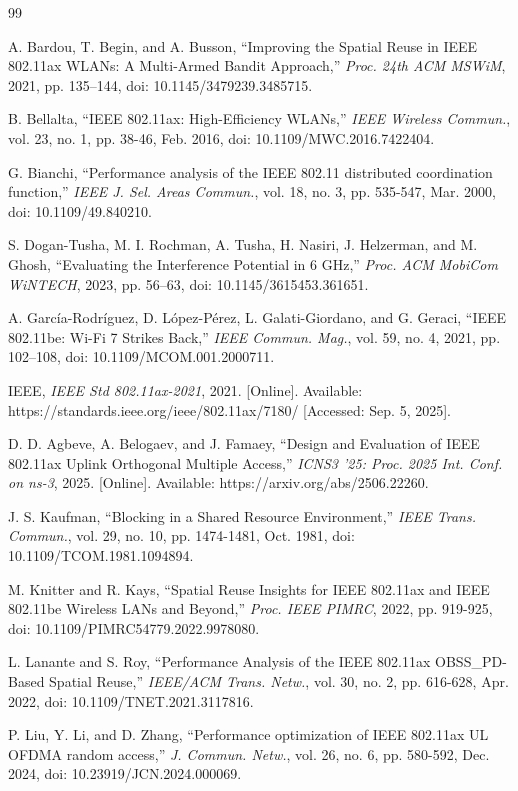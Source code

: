 \documentclass[conference]{IEEEtran}
\begin{document}

\begin{thebibliography}{99}

 A. Bardou, T. Begin, and A. Busson, ``Improving the Spatial Reuse in IEEE 802.11ax WLANs: A Multi-Armed Bandit Approach,'' \textit{Proc. 24th ACM MSWiM}, 2021, pp. 135–144, doi: 10.1145/3479239.3485715.

 B. Bellalta, ``IEEE 802.11ax: High-Efficiency WLANs,'' \textit{IEEE Wireless Commun.}, vol. 23, no. 1, pp. 38-46, Feb. 2016, doi: 10.1109/MWC.2016.7422404.

 G. Bianchi, ``Performance analysis of the IEEE 802.11 distributed coordination function,'' \textit{IEEE J. Sel. Areas Commun.}, vol. 18, no. 3, pp. 535-547, Mar. 2000, doi: 10.1109/49.840210.

 S. Dogan-Tusha, M. I. Rochman, A. Tusha, H. Nasiri, J. Helzerman, and M. Ghosh, ``Evaluating the Interference Potential in 6 GHz,'' \textit{Proc. ACM MobiCom WiNTECH}, 2023, pp. 56–63, doi: 10.1145/3615453.361651.

 A. García-Rodríguez, D. López-Pérez, L. Galati-Giordano, and G. Geraci, ``IEEE 802.11be: Wi-Fi 7 Strikes Back,'' \textit{IEEE Commun. Mag.}, vol. 59, no. 4, 2021, pp. 102–108, doi: 10.1109/MCOM.001.2000711.

 IEEE, \textit{IEEE Std 802.11ax-2021}, 2021. [Online]. Available: https://standards.ieee.org/ieee/802.11ax/7180/ [Accessed: Sep. 5, 2025].

 D. D. Agbeve, A. Belogaev, and J. Famaey, ``Design and Evaluation of IEEE 802.11ax Uplink Orthogonal Multiple Access,'' \textit{ICNS3 '25: Proc. 2025 Int. Conf. on ns-3}, 2025. [Online]. Available: https://arxiv.org/abs/2506.22260.

 J. S. Kaufman, ``Blocking in a Shared Resource Environment,'' \textit{IEEE Trans. Commun.}, vol. 29, no. 10, pp. 1474-1481, Oct. 1981, doi: 10.1109/TCOM.1981.1094894.

 M. Knitter and R. Kays, ``Spatial Reuse Insights for IEEE 802.11ax and IEEE 802.11be Wireless LANs and Beyond,'' \textit{Proc. IEEE PIMRC}, 2022, pp. 919-925, doi: 10.1109/PIMRC54779.2022.9978080.

 L. Lanante and S. Roy, ``Performance Analysis of the IEEE 802.11ax OBSS\_PD-Based Spatial Reuse,'' \textit{IEEE/ACM Trans. Netw.}, vol. 30, no. 2, pp. 616-628, Apr. 2022, doi: 10.1109/TNET.2021.3117816.

 P. Liu, Y. Li, and D. Zhang, ``Performance optimization of IEEE 802.11ax UL OFDMA random access,'' \textit{J. Commun. Netw.}, vol. 26, no. 6, pp. 580-592, Dec. 2024, doi: 10.23919/JCN.2024.000069.


\end{thebibliography}
\end{document}
